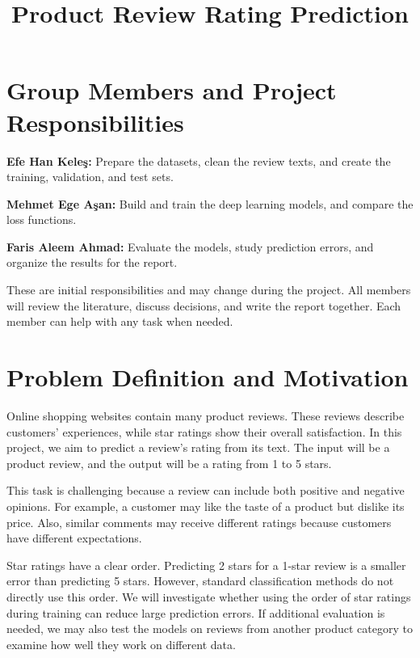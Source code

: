 \documentclass[conference,a4paper,9pt]{IEEEtran}
\title{Product Review Rating Prediction}
\author{}
\begin{document}
\maketitle

\section*{Group Members and Project Responsibilities}

\noindent\textbf{Efe Han Kele\c{s}:} Prepare the datasets, clean the review texts, and create the training, validation, and test sets.

\noindent\textbf{Mehmet Ege A\c{s}an:} Build and train the deep learning models, and compare the loss functions.

\noindent\textbf{Faris Aleem Ahmad:} Evaluate the models, study prediction errors, and organize the results for the report.

These are initial responsibilities and may change during the project. All members will review the literature, discuss decisions, and write the report together. Each member can help with any task when needed.

\section{Problem Definition and Motivation}

Online shopping websites contain many product reviews. These reviews describe customers' experiences, while star ratings show their overall satisfaction. In this project, we aim to predict a review's rating from its text. The input will be a product review, and the output will be a rating from 1 to 5 stars.

This task is challenging because a review can include both positive and negative opinions. For example, a customer may like the taste of a product but dislike its price. Also, similar comments may receive different ratings because customers have different expectations.

Star ratings have a clear order. Predicting 2 stars for a 1-star review is a smaller error than predicting 5 stars. However, standard classification methods do not directly use this order. We will investigate whether using the order of star ratings during training can reduce large prediction errors. If additional evaluation is needed, we may also test the models on reviews from another product category to examine how well they work on different data.
\end{document}
